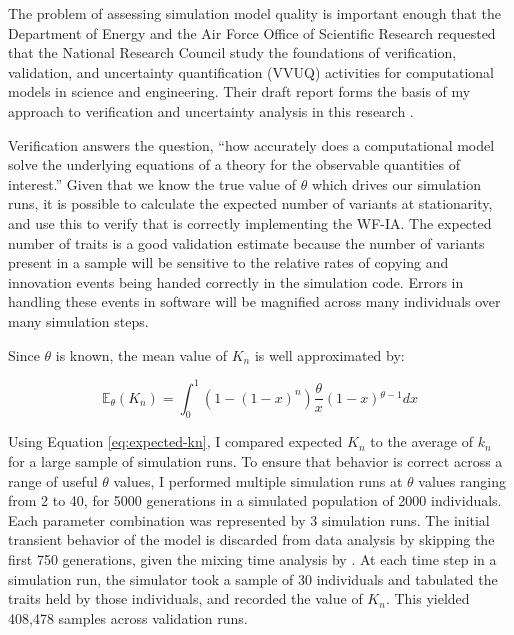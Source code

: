 The problem of assessing simulation model quality is important enough that the Department of Energy and the Air Force Office of Scientific Research requested that the National Research Council study the foundations of verification, validation, and uncertainty quantification (VVUQ) activities for computational models in science and engineering.  Their draft report forms the basis of my approach to verification and uncertainty analysis in this research \citep{national2012Assessing}.%

Verification answers the question, ``how accurately does a computational model solve the underlying equations of a theory for the observable quantities of interest.''  %
Given that we know the true value of $\theta$ which drives our simulation runs, it is possible to calculate the expected number of variants at stationarity, and use this to verify that \tf is correctly implementing the WF-IA.   The expected number of traits is a good validation estimate because the number of variants present in a sample will be sensitive to the relative rates of copying and innovation events being handed correctly in the simulation code.  Errors in handling these events in software will be magnified across many individuals over many simulation steps.  

Since $\theta$ is known, the mean value of $K_n$ is well approximated by:

\begin{equation} 
\label{eq:expected-kn}
	\mathbb{E}_{\theta}(K_n) = \int _0^1\left(1-(1-x)^n\right)\frac{\theta }{x}(1-x){}^{\theta -1} dx
\end{equation}

Using Equation \eqref{eq:expected-kn}, I compared expected $K_n$ to the average of $k_n$  for a large sample of simulation runs.  To ensure that behavior is correct across a range of useful $\theta$ values, I performed multiple simulation runs at $\theta$ values ranging from 2 to 40, for 5000 generations in a simulated population of 2000 individuals.  Each parameter combination was represented by 3 simulation runs.  The initial transient behavior of the model is discarded from data analysis by skipping the first 750 generations, given the mixing time analysis by \citet{Watkins2010}.  At each time step in a simulation run, the simulator took a sample of 30 individuals and tabulated the traits held by those individuals, and recorded the value of $K_n$.  This yielded 408,478 samples across validation runs.  

